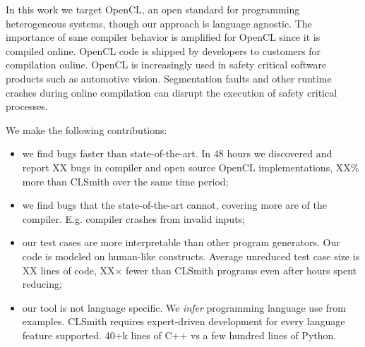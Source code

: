 In this work we target OpenCL, an open standard for programming heterogeneous systems, though our approach is language agnostic. The importance of sane compiler behavior is amplified for OpenCL since it is compiled online. OpenCL code is shipped by developers to customers for compilation online. OpenCL is increasingly used in safety critical software products such as automotive vision. Segmentation faults and other runtime crashes during online compilation can disrupt the execution of safety critical processes.

\noindent We make the following contributions:
%
\begin{itemize}
\item we find bugs faster than state-of-the-art. In 48 hours we discovered and report XX bugs in compiler and open source OpenCL implementations, XX\% more than CLSmith over the same time period;
\item we find bugs that the state-of-the-art cannot, covering more are of the compiler. E.g. compiler crashes from invalid inputs;
\item our test cases are more interpretable than other program generators. Our code is modeled on human-like constructs. Average unreduced test case size is XX lines of code, XX$\times$ fewer than CLSmith programs even after hours spent reducing;
\item our tool is not language specific. We \emph{infer} programming language use from examples. CLSmith requires expert-driven development for every language feature supported. 40+k lines of C++ vs a few hundred lines of Python.
\end{itemize}
